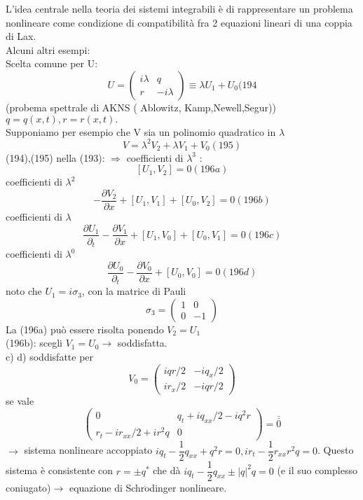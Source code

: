 \documentclass[a4paper,11pt]{report}
\begin{document}
L'idea centrale nella teoria dei sistemi integrabili è di rappresentare un problema nonlineare come condizione di compatibilità fra 2 equazioni lineari di una coppia di Lax.\\
Alcuni altri esempi:\\
Scelta comune per U: 
\begin{equation}
U=\left(\begin{matrix}
i\lambda & q \\
r & -i\lambda
\end{matrix}\right) \equiv \lambda U_1 + U_0 (194
\end{equation}
(probema spettrale di AKNS ( Ablowitz, Kamp,Newell,Segur))
$q=q(x,t), r=r(x,t).$\\
Supponiamo per esempio che V sia un polinomio quadratico in $\lambda$
\begin{equation}
V=\lambda^2 V_2 + \lambda V_1 + V_0 (195)
\end{equation}
(194),(195) nella (193): $\Rightarrow$ coefficienti di $\lambda^3$ :
\begin{equation}
\left[U_1,V_2\right]=0 (196a)
\end{equation}
coefficienti di $\lambda^2$
\begin{equation}
-\dfrac{\partial V_2}{\partial x} + \left[U_1,V_1\right] + \left[U_0,V_2\right]=0 (196b)
\end{equation}
coefficienti di $\lambda$
\begin{equation}
\dfrac{\partial U_1}{\partial_t }-\dfrac{\partial V_1}{\partial x} + \left[U_1,V_0\right] + \left[U_0,V_1\right]=0 (196c)
\end{equation}
coefficienti di $\lambda^0$
\begin{equation}
\dfrac{\partial U_0}{\partial_t }-\dfrac{\partial V_0}{\partial x} + \left[U_0,V_0\right] =0 (196d)
\end{equation}
noto che $U_1=i\sigma_3$, con la matrice di Pauli
$$
\sigma_3=\left(\begin{matrix}
1 & 0 \\
0 & -1
\end{matrix}\right)
$$
La (196a) può essere risolta ponendo $V_2=U_1$\\
(196b): scegli $V_1=U_0 \rightarrow$ soddisfatta.\\
c) d) soddisfatte per 
$$
V_0=\left(\begin{matrix}
iqr/2 & - iq_x/2 \\
ir_x/2 & - iqr/2
\end{matrix}\right)
$$
se vale 
$$
\left(\begin{matrix}
0 & q_t + iq_{xx}/2 - iq^2 r \\
r_t - ir_{xx}/2 + ir^2 q & 0
\end{matrix}\right)=\bar{\bar{0}}
$$
$\rightarrow$ sistema nonlineare accoppiato $ iq_t - \dfrac{1}{2}q_{xx} + q^2 r=0, ir_t - \dfrac{1}{2} r_{xx} r^2 q =0 $.
Questo sistema è consistente con $r=\pm q^*$ che dà $ iq_t - \dfrac{1}{2}q_{xx}\pm |q|^2 q=0$ (e il suo complesso coniugato)$\rightarrow$ equazione di Schr$\ddot{\text{o}}$dinger  nonlineare.
\end{document}
